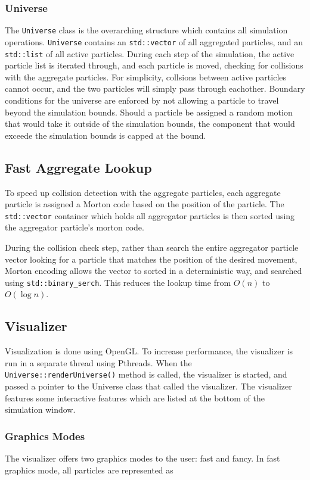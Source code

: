 \documentclass[fleqn,10pt]{SelfArx} %
\begin{document}
\subsubsection{Universe}
The \texttt{Universe} class is the overarching structure which contains all simulation operations. \texttt{Universe} contains an \texttt{std\allowbreak::vector} of all aggregated particles, and an \texttt{std\allowbreak::list} of all active particles. During each step of the simulation, the active particle list is iterated through, and each particle is moved, checking for collisions with the aggregate particles. For simplicity, collsions between active particles cannot occur, and the two particles will simply pass through eachother. Boundary conditions for the universe are enforced by not allowing a particle to travel beyond the simulation bounds. Should a particle be assigned a random motion that would take it outside of the simulation bounds, the component that would exceede the simulation bounds is capped at the bound.

\subsection{Fast Aggregate Lookup}
To speed up collision detection with the aggregate particles, each aggregate particle is assigned a Morton code based on the position of the particle. The \texttt{std\allowbreak::vector} container which holds all aggregator particles is then sorted using the aggregator particle's morton code.

During the collision check step, rather than search the entire aggregator particle vector looking for a particle that matches the position of the desired movement, Morton encoding allows the vector to sorted in a deterministic way, and searched using \texttt{std\allowbreak::binary\_serch}. This reduces the lookup time from $O(n)$ to $O(\log n)$.
\subsection{Visualizer}
Visualization is done using OpenGL. To increase performance, the visualizer is run in a separate thread using Pthreads. When the \texttt{Universe\allowbreak::renderUniverse()} method is called, the visualizer is started, and passed a pointer to the Universe class that called the visualizer. The visualizer features some interactive features which are listed at the bottom of the simulation window. 
\subsubsection{Graphics Modes}
The visualizer offers two graphics modes to the user: fast and fancy. In fast graphics mode, all particles are represented as 
\end{document}
